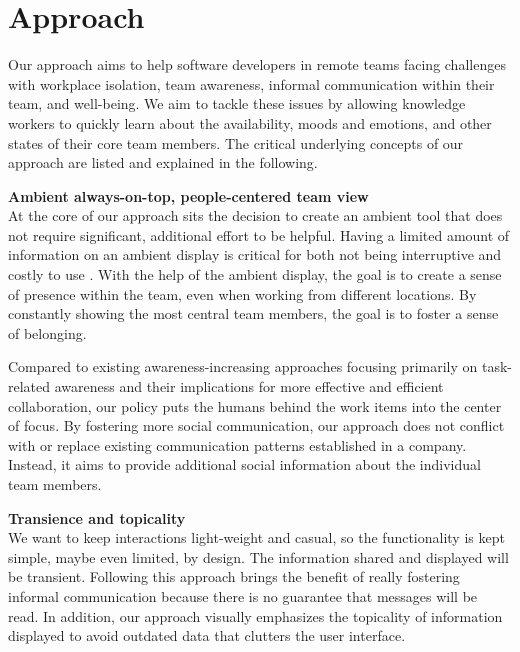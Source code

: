 \chapter{Approach}
\label{chapter:approach}

Our approach aims to help software developers in remote teams facing challenges with workplace isolation, team awareness, informal communication within their team, and well-being. We aim to tackle these issues by allowing knowledge workers to quickly learn about the availability, moods and emotions, and other states of their core team members. The critical underlying concepts of our approach are listed and explained in the following.

\medskip\noindent\textbf{Ambient always-on-top, people-centered team view} \\
At the core of our approach sits the decision to create an ambient tool that does not require significant, additional effort to be helpful. Having a limited amount of information on an ambient display is critical for both not being interruptive and costly to use \autocite{dabbish2004controlling}. With the help of the ambient display, the goal is to create a sense of presence within the team, even when working from different locations. By constantly showing the most central team members, the goal is to foster a sense of belonging.

Compared to existing awareness-increasing approaches focusing primarily on task-related awareness and their implications for more effective and efficient collaboration, our policy puts the humans behind the work items into the center of focus. By fostering more social communication, our approach does not conflict with or replace existing communication patterns established in a company. Instead, it aims to provide additional social information about the individual team members.

\medskip\noindent\textbf{Transience and topicality} \\
We want to keep interactions light-weight and casual, so the functionality is kept simple, maybe even limited, by design. The information shared and displayed will be transient. Following this approach brings the benefit of really fostering informal communication because there is no guarantee that messages will be read. In addition, our approach visually emphasizes the topicality of information displayed to avoid outdated data that clutters the user interface.


